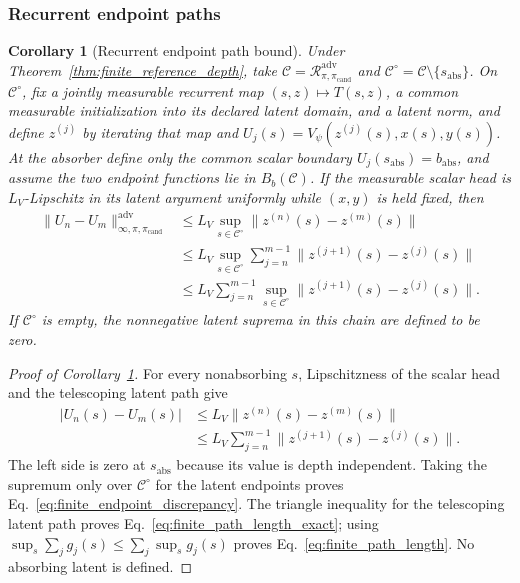 \documentclass{article}
\theoremstyle{plain}
\newtheorem{corollary}[theorem]{Corollary}
\theoremstyle{definition}
\theoremstyle{remark}
\begin{document}
\subsubsection{Recurrent endpoint paths}
\label{app:recurrent_path}

\begin{corollary}[Recurrent endpoint path bound]
\label{cor:recurrent_endpoint_path}
Under Theorem~\ref{thm:finite_reference_depth}, take
$\mathcal C=\mathcal R_{\pi,\pi_{\mathrm{cand}}}^{\mathrm{adv}}$ and
$\mathcal C^\circ=\mathcal C\setminus\{s_{\mathrm{abs}}\}$. On
$\mathcal C^\circ$, fix a jointly measurable recurrent map
$(s,z)\mapsto T(s,z)$, a common measurable initialization into its declared
latent domain, and a latent norm, and define $z^{(j)}$ by iterating that map
and $U_j(s)=V_\psi(z^{(j)}(s),x(s),y(s))$. At the absorber define only the
common scalar boundary $U_j(s_{\mathrm{abs}})=b_{\mathrm{abs}}$, and assume the two endpoint
functions lie in $B_b(\mathcal C)$. If the measurable scalar head is
$L_V$-Lipschitz in its latent argument uniformly while $(x,y)$ is held fixed,
then
\begin{align}
\|U_n-U_m\|_{\infty,\pi,\pi_{\mathrm{cand}}}^{\mathrm{adv}}
&\le
L_V\sup_{s\in\mathcal C^\circ}
\|z^{(n)}(s)-z^{(m)}(s)\|
\label{eq:finite_endpoint_discrepancy}\\
&\le
L_V\sup_{s\in\mathcal C^\circ}
\sum_{j=n}^{m-1}
\|z^{(j+1)}(s)-z^{(j)}(s)\|
\label{eq:finite_path_length_exact}\\
&\le
L_V\sum_{j=n}^{m-1}
\sup_{s\in\mathcal C^\circ}
\|z^{(j+1)}(s)-z^{(j)}(s)\|.
\label{eq:finite_path_length}
\end{align}
If $\mathcal C^\circ$ is empty, the nonnegative latent suprema in this
chain are defined to be zero.
\end{corollary}

\begin{proof}[Proof of Corollary~\ref{cor:recurrent_endpoint_path}]
For every nonabsorbing $s$, Lipschitzness of the scalar head and the telescoping latent path give
\begin{align*}
|U_n(s)-U_m(s)|
&\le L_V\|z^{(n)}(s)-z^{(m)}(s)\| \\
&\le L_V\sum_{j=n}^{m-1}\|z^{(j+1)}(s)-z^{(j)}(s)\|.
\end{align*}
The left side is zero at $s_{\mathrm{abs}}$ because its value is depth
independent. Taking the supremum only over $\mathcal C^\circ$ for the latent
endpoints proves Eq.~\eqref{eq:finite_endpoint_discrepancy}. The triangle
inequality for the telescoping latent path proves
Eq.~\eqref{eq:finite_path_length_exact}; using
$\sup_s\sum_j g_j(s)\le\sum_j\sup_s g_j(s)$ proves
Eq.~\eqref{eq:finite_path_length}. No absorbing latent is defined.
\end{proof}
\end{document}
